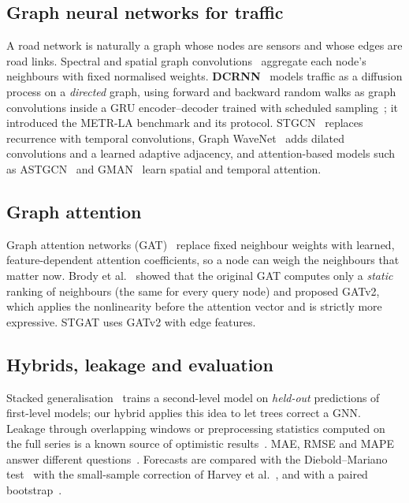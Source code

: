 \documentclass[11pt,a4paper]{article}
\begin{document}
\subsection{Graph neural networks for traffic}
A road network is naturally a graph whose nodes are sensors and whose edges are road links. Spectral and spatial graph
convolutions~\citep{kipf2017gcn} aggregate each node's neighbours with fixed normalised weights.
\textbf{DCRNN}~\citep{li2018dcrnn} models traffic as a diffusion process on a \emph{directed} graph, using forward and
backward random walks as graph convolutions inside a GRU encoder--decoder trained with scheduled
sampling~\citep{bengio2015scheduled}; it introduced the METR-LA benchmark and its protocol.
STGCN~\citep{yu2018stgcn} replaces recurrence with temporal convolutions, Graph WaveNet~\citep{wu2019graphwavenet} adds
dilated convolutions and a learned adaptive adjacency, and attention-based models such as
ASTGCN~\citep{guo2019astgcn} and GMAN~\citep{zheng2020gman} learn spatial and temporal attention.

\subsection{Graph attention}
Graph attention networks (GAT)~\citep{velickovic2018gat} replace fixed neighbour weights with learned,
feature-dependent attention coefficients, so a node can weigh the neighbours that matter now. Brody et
al.~\citep{brody2022gatv2} showed that the original GAT computes only a \emph{static} ranking of neighbours (the same
for every query node) and proposed GATv2, which applies the nonlinearity before the attention vector and is strictly
more expressive. STGAT uses GATv2 with edge features.

\subsection{Hybrids, leakage and evaluation}
Stacked generalisation~\citep{wolpert1992stacking} trains a second-level model on \emph{held-out} predictions of
first-level models; our hybrid applies this idea to let trees correct a GNN. Leakage through overlapping windows or
preprocessing statistics computed on the full series is a known source of optimistic results~\citep{kaufman2012leakage}.
MAE, RMSE and MAPE answer different questions~\citep{hyndman2006measures}. Forecasts are compared with the
Diebold--Mariano test~\citep{diebold1995dm} with the small-sample correction of Harvey et al.~\citep{harvey1997hln}, and
with a paired bootstrap~\citep{efron1993bootstrap}.
\end{document}
